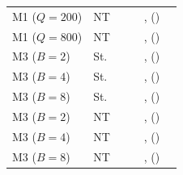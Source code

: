 \begin{table}[!t]
\begin{tabular}{@{}llcccc@{}}
M1 ($Q{=}200$) & NT & \RNumSpearmanRNNewTopicMOne{} & \RNumSpearmanNewVecsNewTopicMOne{} & \RNumSpearmanPairedNNewTopicMOne{}, \RNumSpearmanZeroEpochsNewTopicMOne{} (\RNumSpearmanZeroPctNewTopicMOne{}) & \RNumForcedShareRNNewTopicMOne{} \\
M1 ($Q{=}800$) & NT & \RNumSpearmanRNNewTopicMOneQEightHundred{} & \RNumSpearmanNewVecsNewTopicMOneQEightHundred{} & \RNumSpearmanPairedNNewTopicMOneQEightHundred{}, \RNumSpearmanZeroEpochsNewTopicMOneQEightHundred{} (\RNumSpearmanZeroPctNewTopicMOneQEightHundred{}) & \RNumForcedShareRNNewTopicMOneQEightHundred{} \\
M3 ($B{=}2$) & St. & \RNumSpearmanRNSteadyMThreeBTwo{} & \RNumSpearmanNewVecsSteadyMThreeBTwo{} & \RNumSpearmanPairedNSteadyMThreeBTwo{}, \RNumSpearmanZeroEpochsSteadyMThreeBTwo{} (\RNumSpearmanZeroPctSteadyMThreeBTwo{}) & \RNumForcedShareRNSteadyMThreeBTwo{} \\
M3 ($B{=}4$) & St. & \RNumSpearmanRNSteadyMThree{} & \RNumSpearmanNewVecsSteadyMThree{} & \RNumSpearmanPairedNSteadyMThree{}, \RNumSpearmanZeroEpochsSteadyMThree{} (\RNumSpearmanZeroPctSteadyMThree{}) & \RNumForcedShareRNSteadyMThree{} \\
M3 ($B{=}8$) & St. & \RNumSpearmanRNSteadyMThreeBEight{} & \RNumSpearmanNewVecsSteadyMThreeBEight{} & \RNumSpearmanPairedNSteadyMThreeBEight{}, \RNumSpearmanZeroEpochsSteadyMThreeBEight{} (\RNumSpearmanZeroPctSteadyMThreeBEight{}) & \RNumForcedShareRNSteadyMThreeBEight{} \\
M3 ($B{=}2$) & NT & \RNumSpearmanRNNewTopicMThreeBTwo{} & \RNumSpearmanNewVecsNewTopicMThreeBTwo{} & \RNumSpearmanPairedNNewTopicMThreeBTwo{}, \RNumSpearmanZeroEpochsNewTopicMThreeBTwo{} (\RNumSpearmanZeroPctNewTopicMThreeBTwo{}) & \RNumForcedShareRNNewTopicMThreeBTwo{} \\
M3 ($B{=}4$) & NT & \RNumSpearmanRNNewTopicMThree{} & \RNumSpearmanNewVecsNewTopicMThree{} & \RNumSpearmanPairedNNewTopicMThree{}, \RNumSpearmanZeroEpochsNewTopicMThree{} (\RNumSpearmanZeroPctNewTopicMThree{}) & \RNumForcedShareRNNewTopicMThree{} \\
M3 ($B{=}8$) & NT & \RNumSpearmanRNNewTopicMThreeBEight{} & \RNumSpearmanNewVecsNewTopicMThreeBEight{} & \RNumSpearmanPairedNNewTopicMThreeBEight{}, \RNumSpearmanZeroEpochsNewTopicMThreeBEight{} (\RNumSpearmanZeroPctNewTopicMThreeBEight{}) & \RNumForcedShareRNNewTopicMThreeBEight{} \\
\bottomrule
\end{tabular}
\end{table}

